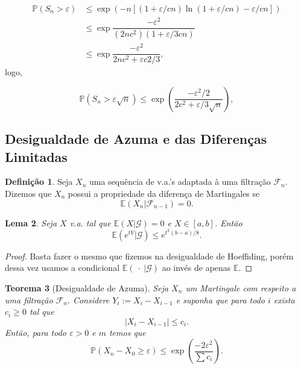 \documentclass[12pt,a4paper,oneside]{book}
\newtheorem{theorem}{Teorema}[section]
\newtheorem{lemma}[theorem]{Lema}
\theoremstyle{definition}
\newtheorem{definition}[theorem]{Defini\c{c}\~ao}
\theoremstyle{remark}
\numberwithin{equation}{section}
\newcommand{\e}{\varepsilon}
\newcommand{\E}{\mathbb{E}}
\newcommand{\pr}{\mathbb{P}}
\newcommand{\ds}{\displaystyle}
\begin{document}
\begin{align*}
\pr(S_n>\e)& \leq \exp(-n [(1+\e/cn )\ln(1+\e/cn) -\e/cn])\\
	&\leq \exp{\dfrac{-\e^2}{(2nc^2)(1+\e/3cn)}}\\
	&\leq \exp{\dfrac{-\e^2}{2nc^2+\e c2/3}},
\end{align*}
logo,

$$\pr(S_n>\e\sqrt{n})\leq \exp\left( \dfrac{-\e^2/2 }{ 2c^2+ \e/3\sqrt{n}}  \right), $$


\subsection{Desigualdade de Azuma e das Diferenças Limitadas}

\begin{definition}\label{defi-marting-diff-seq}
Seja $X_n$ uma sequência de v.a.'s adaptada à uma filtração $\mathcal{F}_n$. Dizemos que $X_n$ possui a propriedade da diferença de Martingales se
$$\E(X_n|\mathcal{F}_{n-1})=0. $$

\end{definition}




\begin{lemma}
Seja $X$ v.a. tal que $\E(X|\mathcal{G}) = 0$ e $X\in[a,b]$. Então
$$\E(e^{tV}|\mathcal{G})\leq e^{t^2(b-a)/8}. $$
\end{lemma}
\begin{proof}
Basta fazer o mesmo que fizemos na desigualdade de Hoeffiding, porém dessa vez usamos a condicional $\E(\ \cdot\ | \mathcal{G})$ ao invés de apenas $\E.$
\end{proof}

\begin{theorem}[Desigualdade de Azuma]\label{Azuma-des}Seja $X_n$ um Martingale com respeito a uma filtração $\mathcal{F}_n.$ Considere $Y_i:= X_i-X_{i-1}$ e suponha que para todo $i$ exista $c_i\geq 0$ tal que
$$|X_i-X_{i-1}|\leq c_i. $$
Então, para todo $\e>0$ e $m$ temos que
$$\pr\left(\ds X_n-X_0 \geq \e \right) \leq \exp \left(\dfrac{-2\e^2}{\sum c_i} \right).  $$ 
\end{theorem}
\end{document}
